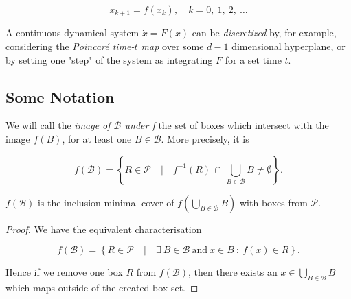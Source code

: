 \begin{equation}
    x_{k+1} = f(x_k), \quad k = 0,\ 1,\ 2,\ \dotsc
\end{equation}

A continuous dynamical system $\dot{x} = F(x)$ can be \emph{discretized} by, for example,
considering the \emph{Poincaré time-$t$ map} over some $d-1$ dimensional hyperplane,
or by setting one "step" of the system as integrating $F$ for a set time $t$. 


\subsection{Some Notation}

\begin{definition}
    We will call the \emph{image of $\mathcal{B}$ under f} 
    the set of boxes which intersect with the image $f(B)$, for at least one 
    $B \in \mathcal{B}$. More precisely, it is 
    
    \begin{equation}
        f (\mathcal{B}) = \left\{
            R \in \mathcal{P} \quad \vert \quad 
            f^{-1} (R)\, \cap\, \bigcup\limits_{B \in \mathcal{B}} B \neq \emptyset
        \right\}.
    \end{equation}

\end{definition}

\begin{theorem}
    $f(\mathcal{B})$ is the inclusion-minimal cover of $f(\bigcup_{B \in \mathcal{B}} B)$
    with boxes from $\mathcal{P}$.
\end{theorem}

\begin{proof}
    We have the equivalent characterisation

    \begin{equation}
        f(\mathcal{B}) = \left\{
            R \in \mathcal{P} \quad \vert \quad
            \exists\ B \in \mathcal{B}\ \text{and}\ x \in B\ :\ f(x) \in R
        \right\}.
    \end{equation}

    Hence if we remove one box $R$ from $f(\mathcal{B})$, then there exists an 
    $x \in \bigcup_{B \in \mathcal{B}} B$ which maps outside of the created box set.

\end{proof}

